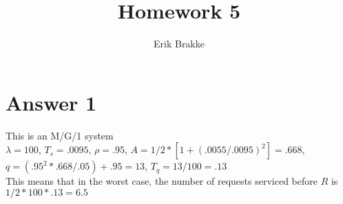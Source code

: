\documentclass[11pt]{article}
\theoremstyle{definition}
\begin{document}
\title{Homework 5}
\author{Erik Brakke}
\maketitle

\thispagestyle{fancy}
 
 
\section*{Answer 1}
This is an M/G/1 system\\
$\lambda = 100$, $T_s = .0095$, $\rho = .95$, $A = 1/2 * [1 + (.0055 / .0095)^2] = .668$, $q = (.95^2 * .668 / .05) + .95 = 13$, $T_q = 13 / 100 = .13$\\
This means that in the worst case, the number of requests serviced before $R$ is $1/2 * 100 * .13 = 6.5$
\end{document}
